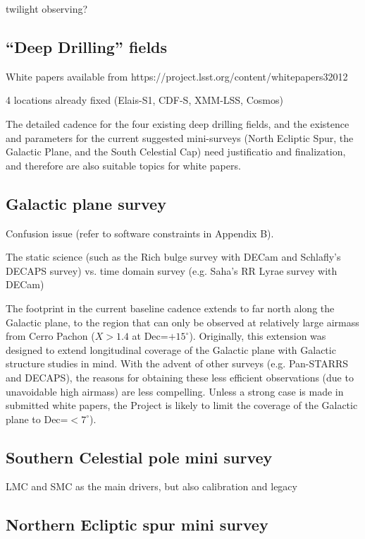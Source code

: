 \documentclass[DM,lsstdraft,toc,usenatbib]{lsstdoc}
\begin{document}
twilight observing? 


\subsection{``Deep Drilling'' fields} 

White papers available from  https://project.lsst.org/content/whitepapers32012

4 locations already fixed (Elais-S1, CDF-S, XMM-LSS, Cosmos) 


The detailed cadence for the four existing deep drilling fields, and the existence and parameters 
for the current suggested mini-surveys (North Ecliptic Spur, the Galactic Plane, and the South 
Celestial Cap) need justificatio and finalization, and therefore are also suitable topics for white papers.  



\subsection{Galactic plane survey}

Confusion issue (refer to software constraints in Appendix B). 

The static science (such as the Rich bulge survey with DECam and Schlafly's DECAPS survey) 
vs. time domain survey (e.g. Saha's RR Lyrae survey with DECam)  

The footprint in the current baseline cadence extends to far north along the Galactic
plane, to the region that can only be observed at relatively large airmass from Cerro Pachon 
($X>1.4$ at Dec=$+15^\circ$). Originally, this extension was designed to extend longitudinal 
coverage of the Galactic plane with Galactic structure studies in mind. With the advent of other 
surveys (e.g. Pan-STARRS and DECAPS), the reasons for obtaining these less efficient observations 
(due to unavoidable high airmass) are less compelling. Unless a strong case is made in submitted
white papers, the Project is likely to limit the coverage of the Galactic plane to  Dec=$<7^\circ$). 



\subsection{Southern Celestial pole mini survey}


LMC and SMC as the main drivers, but also calibration and legacy 


\subsection{Northern Ecliptic spur mini survey}
\end{document}
